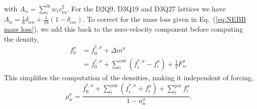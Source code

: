 \documentclass[fleqn,a4paper]{article} %
\numberwithin{equation}{section} %
\numberwithin{figure}{section} %
\numberwithin{table}{section} %
\numberwithin{algorithm}{section} %
\begin{document}
with $A_\alpha = \sum_i^\text{in} w_i c_{i\alpha}^2$. For the D2Q9, D3Q19 and D3Q27 lattices we have $A_\alpha = \frac{1}{6}\delta_{\alpha n} + \frac{1}{18}(1 - \delta_{\alpha n})$. To correct for the mass loss given in Eq.~(\ref{eq:NEBB mass loss}), we add this back to the zero-velocity component before computing the density,
\begin{equation}
\begin{split}
    f_0^\sigma &= f_0^{*,\sigma} + \Delta m^\sigma\\
    &= f_0^{*,\sigma} + \sum_i^{\text{out}}\left(f_i^{*,\sigma} - f_i^\sigma\right) + \frac{1}{2}F^\sigma_n.
\end{split}
\end{equation}
This simplifies the computation of the densities, making it independent of forcing,
\begin{equation}
    \rho^\sigma_w = \frac{f_0^{*,\sigma} + \sum_i^\text{out}\left(f_i^{*,\sigma} + f_i^\sigma\right) + \sum_i^\text{par}f_i^\sigma}{1 - u_n^\sigma}.
\end{equation}
\end{document}
